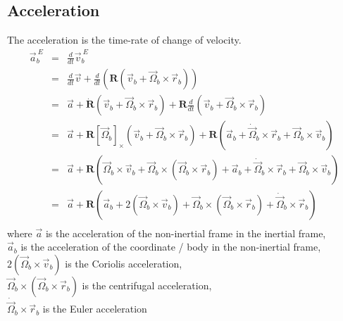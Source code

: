 \subsection{Acceleration}
The acceleration is the time-rate of change of velocity.
\begin{equation} \nonumber
    \begin{aligned}
        \vec{a}^{\ E}_b & = & \frac{d}{dt} \vec{v}^{\ E}_b                                                                                                                                                                                           \\
                        & = & \frac{d}{dt} \vec{v} + \frac{d}{dt} \left( \mathbf{R} \left(\vec{v}_b + \vec{\Omega}_b \times \vec{r}_b \right) \right)                                                                                                \\
                        & = & \vec{a} + \dot{\mathbf{R}} \left(\vec{v}_b + \vec{\Omega}_b \times \vec{r}_b \right) + \mathbf{R} \frac{d}{dt} \left(\vec{v}_b + \vec{\Omega}_b \times \vec{r}_b \right)                                               \\
                        & = & \vec{a} + \mathbf{R} [\vec{\Omega}_b]_\times \left(\vec{v}_b + \vec{\Omega}_b \times \vec{r}_b \right) + \mathbf{R} \left( \vec{a}_b + \dot{\vec{\Omega}}_b \times \vec{r}_b + \vec{\Omega}_b \times \vec{v}_b \right) \\
                        & = & \vec{a} + \mathbf{R} \left( \vec{\Omega}_b \times \vec{v}_b + \vec{\Omega}_b \times (\vec{\Omega}_b \times \vec{r}_b) +  \vec{a}_b + \dot{\vec{\Omega}}_b \times \vec{r}_b + \vec{\Omega}_b \times \vec{v}_b\right)    \\
                        & = & \vec{a} + \mathbf{R} \left(\vec{a}_b + 2 (\vec{\Omega}_b \times \vec{v}_b) + \vec{\Omega}_b \times(\vec{\Omega}_b \times \vec{r}_b) +  \dot{\vec{\Omega}}_b \times \vec{r}_b\right)                                    \\
    \end{aligned}
\end{equation}
where \(\vec{a}\) is the acceleration of the non-inertial frame in the inertial frame, \\
\(\vec{a}_b\) is the acceleration of the coordinate / body in the non-inertial frame, \\
\(2 (\vec{\Omega}_b \times \vec{v}_b)\) is the Coriolis acceleration, \\
\(\vec{\Omega}_b \times(\vec{\Omega}_b \times \vec{r}_b) \) is the centrifugal acceleration, \\
\(\dot{\vec{\Omega}}_b \times \vec{r}_b \) is the Euler acceleration\\


